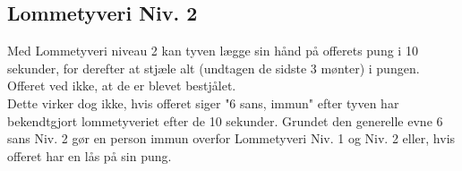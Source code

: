 \subsection*{Lommetyveri Niv. 2}
Med Lommetyveri niveau 2 kan tyven lægge sin hånd på offerets pung i 10 sekunder, for derefter at stjæle alt (undtagen de sidste 3 mønter) i pungen. Offeret ved ikke, at de er blevet bestjålet. \\
Dette virker dog ikke, hvis offeret siger "6 sans, immun" efter tyven har bekendtgjort lommetyveriet efter de 10 sekunder. Grundet den generelle evne 6 sans Niv. 2 gør en person immun overfor Lommetyveri Niv. 1 og Niv. 2 eller, hvis offeret har en lås på sin pung.\\